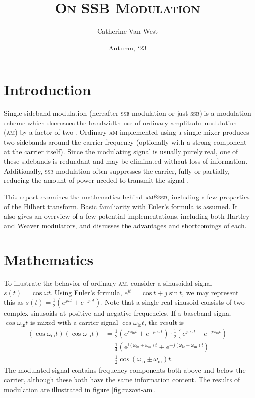 \documentclass[12pt]{article}
\title{\textsc{On SSB Modulation}}
\author{Catherine Van West}
\date{Autumn, `23}
\newcommand{\amp}{\textit{\&}\xspace}
\newcommand{\am}{\textsc{am}\xspace}
\newcommand{\ssb}{\textsc{ssb}\xspace}
\begin{document}
\maketitle

\section*{Introduction}
Single-sideband modulation (hereafter \ssb modulation or just \ssb) is a
modulation scheme which decreases the bandwidth use of ordinary amplitude
modulation (\am) by a factor of two \autocite{ssb-thaddeus}. Ordinary \am
implemented using a single mixer produces two sidebands around the carrier
frequency (optionally with a strong component at the carrier itself). Since the
modulating signal is usually purely real, one of these sidebands is redundant
and may be eliminated without loss of information. Additionally, \ssb
modulation often suppresses the carrier, fully or partially, reducing the
amount of power needed to transmit the signal \autocite{weaver-rowell}.

This report examines the mathematics behind \am \amp \ssb, including a few
properties of the Hilbert transform. Basic familiarity with Euler's formula is
assumed. It also gives an overview of a few potential implementations,
including both Hartley and Weaver modulators, and discusses the advantages and
shortcomings of each.

\section*{Mathematics}

\newcommand{\oin}{\omega_\text{in}}
\newcommand{\olo}{\omega_\text{lo}}

To illustrate the behavior of ordinary \am, consider a sinusoidal signal \(s(t)
= \cos \omega t\). Using Euler's formula, \(e^{jt} = \cos t + j \sin t\), we
may represent this as \(s(t) = \frac 1 2 (e^{j \omega t} + e^{- j \omega t})\).
Note that a single real sinusoid consists of two complex sinusoids at positive
and negative frequencies. If a baseband signal \(\cos \oin t\) is mixed with a
carrier signal \(\cos \olo t\), the result is
\begin{align*}
	\left(\cos \oin t\right) \left(\cos \olo t\right)
		&= \frac 1 2 \left(e^{j \oin t} + e^{-j \oin t}\right)
			\cdot \frac 1 2 \left(
				e^{j \olo t} + e^{-j \olo t}
			\right) \\
		&= \frac 1 4 \left(
			e^{j (\olo \pm \oin) t} + e^{-j (\olo \pm \oin) t}
		\right) \\
		&= \frac 1 2 \cos (\olo \pm \oin) t.
\end{align*}
The modulated signal contains frequency components both above and below the
carrier, although these both have the same information content. The results of
modulation are illustrated in figure \ref{fig:razavi-am}.
\end{document}
